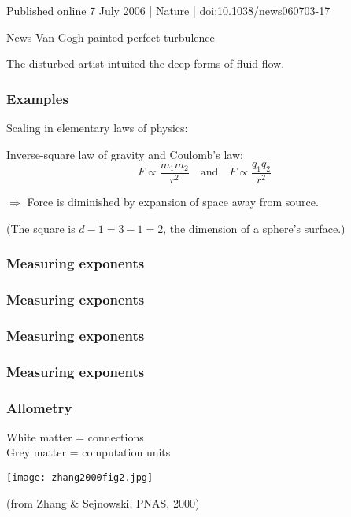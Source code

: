 \begin{frame}
  

Published online 7 July 2006 | Nature | doi:10.1038/news060703-17

News
Van Gogh painted perfect turbulence

The disturbed artist intuited the deep forms of fluid flow.

\end{frame}


\begin{frame}
  \frametitle{Examples}

  Scaling in elementary laws of physics:

  Inverse-square law of gravity
  and Coulomb's law: 
  $$F \propto \frac{m_1 m_2}{r^{2}}
  \quad \mbox{and} \quad
  F \propto \frac{q_1 q_2}{r^{2}}$$

  $\Rightarrow$ Force is diminished by expansion of
  space away from source.  

  (The square is $d-1=3-1=2$, the dimension of
  a sphere's surface.)




\end{frame}

\begin{frame}
  \frametitle{Measuring exponents}
\end{frame}

\begin{frame}
  \frametitle{Measuring exponents}
\end{frame}

\begin{frame}
  \frametitle{Measuring exponents}
\end{frame}

\begin{frame}
  \frametitle{Measuring exponents}



\end{frame}

\begin{frame}
  \frametitle{Allometry}

  White matter = connections\\
  Grey matter = computation units

  \begin{center}
    \texttt{[image: zhang2000fig2.jpg]}  
  \end{center}

  \hfill{\tiny(from Zhang \& Sejnowski, PNAS, 2000)}

\end{frame}

